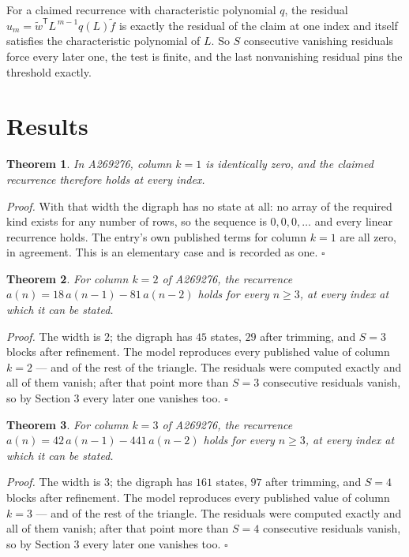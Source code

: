\documentclass[11pt]{article}
\newtheorem{theorem}{Theorem}
\theoremstyle{definition}
\begin{document}
For a claimed recurrence with characteristic polynomial $q$, the residual $u_m = \tilde w^{\mathsf T}L^{\,m-1}q(L)\tilde f$ is exactly the residual of the claim at one index and itself satisfies the characteristic polynomial of $L$. So $S$ consecutive vanishing residuals force every later one, the test is finite, and the last nonvanishing residual pins the threshold exactly.

\section{Results}

\begin{theorem} In A269276, column $k = 1$ is identically zero, and the claimed recurrence therefore holds at every index.\end{theorem}

{\itshape Proof.} With that width the digraph has no state at all: no array of the required kind exists for any number of rows, so the sequence is $0,0,0,\dots$ and every linear recurrence holds. The entry's own published terms for column $k = 1$ are all zero, in agreement. This is an elementary case and is recorded as one. $\square$

\begin{theorem} For column $k = 2$ of A269276, the recurrence $a(n) = 18\,a(n-1) - 81\,a(n-2)$ holds for every $n \ge 3$, at every index at which it can be stated.\end{theorem}

{\itshape Proof.} The width is $2$; the digraph has $45$ states, $29$ after trimming, and $S = 3$ blocks after refinement. The model reproduces every published value of column $k = 2$ --- and of the rest of the triangle. The residuals were computed exactly and all of them vanish; after that point more than $S = 3$ consecutive residuals vanish, so by Section 3 every later one vanishes too. $\square$

\begin{theorem} For column $k = 3$ of A269276, the recurrence $a(n) = 42\,a(n-1) - 441\,a(n-2)$ holds for every $n \ge 3$, at every index at which it can be stated.\end{theorem}

{\itshape Proof.} The width is $3$; the digraph has $161$ states, $97$ after trimming, and $S = 4$ blocks after refinement. The model reproduces every published value of column $k = 3$ --- and of the rest of the triangle. The residuals were computed exactly and all of them vanish; after that point more than $S = 4$ consecutive residuals vanish, so by Section 3 every later one vanishes too. $\square$
\end{document}
